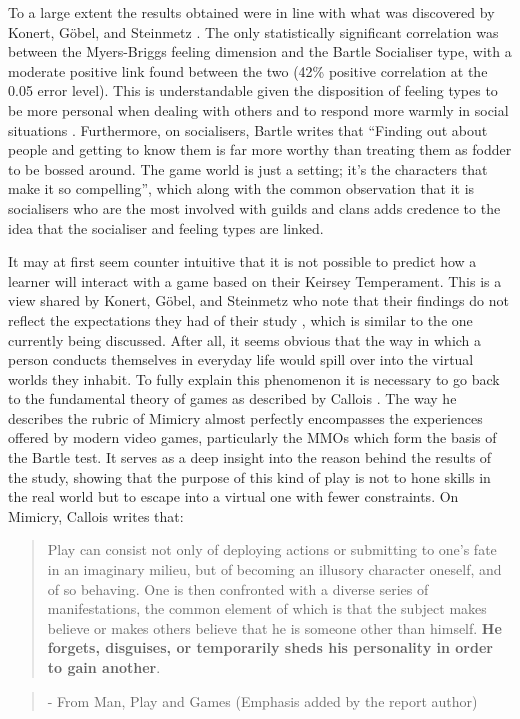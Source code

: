 \documentclass[12pt,a4paper,twoside]{report}
\begin{document}
To a large extent the results obtained were in line with what was discovered by Konert, G{\"o}bel, and Steinmetz \cite{konertmodeling}. The only statistically significant correlation was between the Myers-Briggs feeling dimension and the Bartle Socialiser type, with a moderate positive link found between the two (42\% positive correlation at the 0.05 error level). This is understandable given the disposition of feeling types to be more personal when dealing with others and to respond more warmly in social situations \cite{keirsey1984}. Furthermore, on socialisers, Bartle writes that ``Finding out about people and getting to know them is far more worthy than treating them as fodder to be bossed around. The game world is just a setting; it's the characters that make it so compelling''\cite{bartle1996hearts}, which along with the common observation that it is socialisers who are the most involved with guilds and clans adds credence to the idea that the socialiser and feeling types are linked. 

It may at first seem counter intuitive that it is not possible to predict how a learner will interact with a game based on their Keirsey Temperament. This is a view shared by Konert, G{\"o}bel, and Steinmetz who note that their findings do not reflect the expectations they had of their study \cite{konertmodeling}, which is similar to the one currently being discussed. After all, it seems obvious that the way in which a person conducts themselves in everyday life would spill over into the virtual worlds they inhabit. To fully explain this phenomenon it is necessary to go back to the fundamental theory of games as described by Callois \cite{caillois1961man}. The way he describes the rubric of Mimicry almost perfectly encompasses the experiences offered by modern video games, particularly the MMOs which form the basis of the Bartle test. It serves as a deep insight into the reason behind the results of the study, showing that the purpose of this kind of play is not to hone skills in the real world but to escape into a virtual one with fewer constraints. On Mimicry, Callois writes that:

\begin{quote}
	Play can consist not only of deploying actions or submitting to one's fate in an imaginary milieu, but of becoming an illusory character oneself, and of so behaving. One is then confronted with a diverse series of manifestations, the common element of which is that the subject makes believe or makes others believe that he is someone other than himself. \textbf{He forgets, disguises, or temporarily sheds his personality in order to gain another}.
\end{quote}
\begin{quote}
	- From Man, Play and Games \cite{caillois1961man} (Emphasis added by the report author)
\end{quote}
\end{document}
